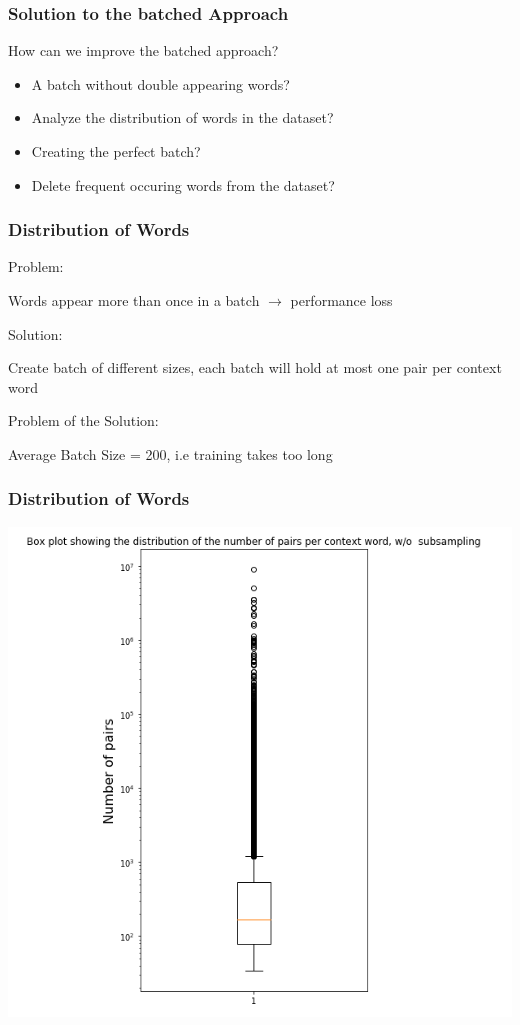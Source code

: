 \begin{frame}
\frametitle{Solution to the batched Approach}
\begin{Large}
How can we improve the batched approach? 
\end{Large}
\begin{itemize}
\item A batch without double appearing words? 
\item Analyze the distribution of words in the dataset?
\item Creating the perfect batch? 
\item Delete frequent occuring words from the dataset? 
\end{itemize}
  \end{frame}
  \begin{frame}
\frametitle{Distribution of Words}
\begin{Large}
Problem:\\
\end{Large}
Words appear more than once in a batch $\rightarrow$ performance loss\\
\begin{Large}
Solution:\\
\end{Large}
Create batch of different sizes, each batch will hold at most one pair per context word\\
\begin{large}
Problem of the Solution:\\
\end{large}
Average Batch Size = 200, i.e training takes too long
  \end{frame}
\begin{frame}
\frametitle{Distribution of Words}
\centering
\includegraphics[scale=0.2]{images/no_sampling_boxplot}
  \end{frame}
